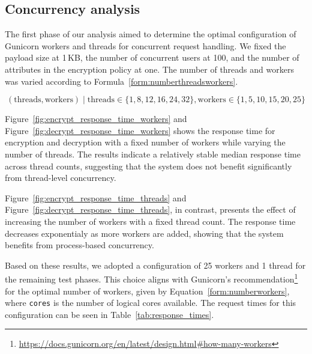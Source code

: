 \documentclass[cic,tc,english]{iiufrgs}
\begin{document}


        \subsection{Concurrency analysis}
        \label{subsec:phase1_concurrency}

        The first phase of our analysis aimed to determine the optimal configuration of Gunicorn workers and threads for concurrent request handling. We fixed the payload size at 1\,KB, the number of concurrent users at 100, and the number of attributes in the encryption policy at one. The number of threads and workers was varied according to Formula~\ref{form:numberthreadsworkers}.

        \begin{equation}
            \label{form:numberthreadsworkers}
            (\text{threads}, \text{workers}) \mid \text{threads} \in \{1, 8, 12, 16, 24, 32\}, \text{workers} \in \{1, 5, 10, 15, 20, 25\} 
        \end{equation}

        Figure~\ref{fig:encrypt_response_time_workers} and Figure~\ref{fig:decrypt_response_time_workers} shows the response time for encryption and decryption with a fixed number of workers while varying the number of threads. The results indicate a relatively stable median response time across thread counts, suggesting that the system does not benefit significantly from thread-level concurrency.

        Figure~\ref{fig:encrypt_response_time_threads} and Figure~\ref{fig:decrypt_response_time_threads}, in contrast, presents the effect of increasing the number of workers with a fixed thread count. The response time decreases exponentialy as more workers are added, showing that the system benefits from process-based concurrency.

        Based on these results, we adopted a configuration of 25 workers and 1 thread for the remaining test phases. This choice aligns with Gunicorn's recommendation\footnote{\url{https://docs.gunicorn.org/en/latest/design.html\#how-many-workers}} for the optimal number of workers, given by Equation~\ref{form:numberworkers}, where \texttt{cores} is the number of logical cores available. The request times for this configuration can be seen in Table~\ref{tab:response_times}.
\end{document}
